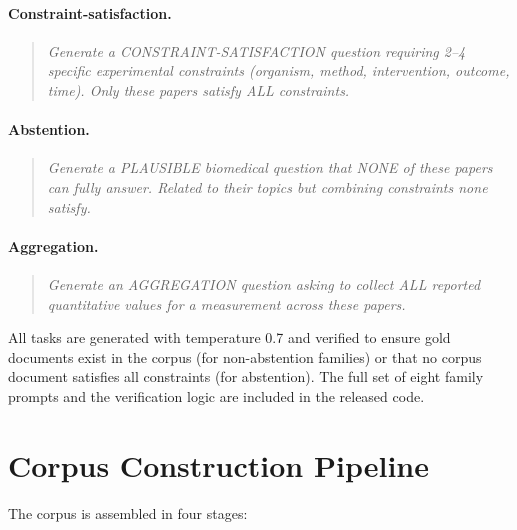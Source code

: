 \documentclass{article}
\begin{document}
\paragraph{Constraint-satisfaction.}
\begin{quote}
\small
\emph{Generate a CONSTRAINT-SATISFACTION question requiring 2--4 specific experimental constraints (organism, method, intervention, outcome, time). Only these papers satisfy ALL constraints.}
\end{quote}

\paragraph{Abstention.}
\begin{quote}
\small
\emph{Generate a PLAUSIBLE biomedical question that NONE of these papers can fully answer. Related to their topics but combining constraints none satisfy.}
\end{quote}

\paragraph{Aggregation.}
\begin{quote}
\small
\emph{Generate an AGGREGATION question asking to collect ALL reported quantitative values for a measurement across these papers.}
\end{quote}

All tasks are generated with temperature 0.7 and verified to ensure gold documents exist in the corpus (for non-abstention families) or that no corpus document satisfies all constraints (for abstention). The full set of eight family prompts and the verification logic are included in the released code.

\section{Corpus Construction Pipeline}
\label{app:pipeline}

The corpus is assembled in four stages:
\end{document}
